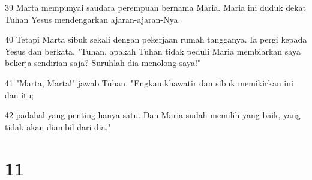 \par 39 Marta mempunyai saudara perempuan bernama Maria. Maria ini duduk dekat Tuhan Yesus mendengarkan ajaran-ajaran-Nya.
\par 40 Tetapi Marta sibuk sekali dengan pekerjaan rumah tangganya. Ia pergi kepada Yesus dan berkata, "Tuhan, apakah Tuhan tidak peduli Maria membiarkan saya bekerja sendirian saja? Suruhlah dia menolong saya!"
\par 41 "Marta, Marta!" jawab Tuhan. "Engkau khawatir dan sibuk memikirkan ini dan itu;
\par 42 padahal yang penting hanya satu. Dan Maria sudah memilih yang baik, yang tidak akan diambil dari dia."

\chapter{11}

